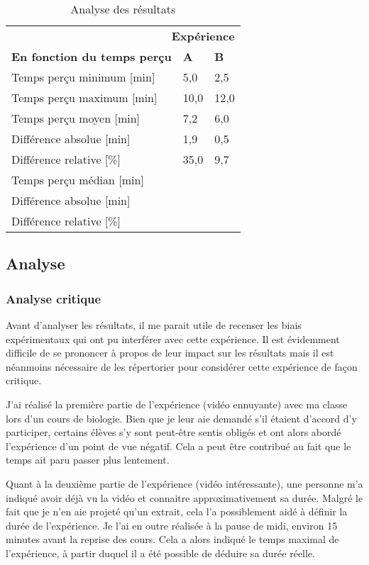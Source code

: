 \documentclass[12pt,fleqn,oneside,openany]{book} %
\begin{document}
\begin{table}[h!]
	\centering
	\caption{Analyse des résultats} \label{tbl:analyse1.1}
	\begin{tabular}{lll}
		\toprule
		\multicolumn{3}{r}{\textbf{Expérience}} \\ 
		\textbf{En fonction du temps perçu} & \textbf{A} & \textbf{B} \\ \midrule
		Temps perçu minimum [min] & 5,0 & 2,5 \\ 
		Temps perçu maximum [min] & 10,0 & 12,0 \\
		Temps perçu moyen [min] & 7,2 & 6,0 \\
		Différence absolue [min] & 1,9 & 0,5 \\ 
		Différence relative [\%] & 35,0 & 9,7 \\
		Temps perçu médian [min] &  & \\ 
		Différence absolue [min] &  & \\ 
		Différence relative [\%] &  & \\ \bottomrule
	\end{tabular}
\end{table}
\clearpage 

\subsection{Analyse} \label{ssec:analyse1.1}

\subsubsection{Analyse critique} \label{sssec:analyseCrit1.1}
Avant d'analyser les résultats, il me parait utile de recenser les biais expérimentaux qui ont pu interférer avec cette expérience. Il est évidemment difficile de se prononcer à propos de leur impact sur les résultats mais il est néanmoins nécessaire de les répertorier pour considérer cette expérience de façon critique.

J'ai réalisé la première partie de l'expérience (vidéo ennuyante) avec ma classe lors d'un cours de biologie. Bien que je leur aie demandé s'il étaient d'accord d'y participer, certains élèves s'y sont peut-être sentis obligés et ont alors abordé l'expérience d'un point de vue négatif. Cela a peut être contribué au fait que le temps ait paru passer plus lentement.

Quant à la deuxième partie de l'expérience (vidéo intéressante), une personne m'a indiqué avoir déjà vu la vidéo et connaitre approximativement sa durée. Malgré le fait que je n'en aie projeté qu'un extrait, cela l'a possiblement aidé à définir la durée de l'expérience.
Je l'ai en outre réalisée à la pause de midi, environ 15 minutes avant la reprise des cours. Cela a alors indiqué le temps maximal de l'expérience, à partir duquel il a été possible de déduire sa durée réelle. 
\end{document}
